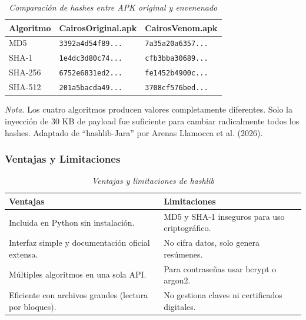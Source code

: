 \documentclass[12pt,a4paper]{article}
\begin{document}
\begin{table}[H]
\centering
\begin{threeparttable}
\caption{\textit{Comparación de hashes entre APK original y envenenado}}
\label{tab:hashes_apk}
\begin{tabular}{p{1.8cm}p{5.3cm}p{5.3cm}}
\toprule
\textbf{Algoritmo} & \textbf{CairosOriginal.apk} & \textbf{CairosVenom.apk} \\
\midrule
MD5 & \texttt{3392a4d54f89...} & \texttt{7a35a20a6357...} \\
SHA-1 & \texttt{1e4dc3d80c74...} & \texttt{cfb3bba30689...} \\
SHA-256 & \texttt{6752e6831ed2...} & \texttt{fe1452b4900c...} \\
SHA-512 & \texttt{201a5bacda49...} & \texttt{3708cf576bed...} \\
\bottomrule
\end{tabular}
\begin{tablenotes}
\item \textit{Nota.} Los cuatro algoritmos producen valores completamente diferentes. Solo la inyección de 30 KB de payload fue suficiente para cambiar radicalmente todos los hashes. Adaptado de \enquote{hashlib-Jara} por Arenas Llamocca et al. (2026).
\end{tablenotes}
\end{threeparttable}
\end{table}

\subsubsection{Ventajas y Limitaciones}

\begin{table}[H]
\centering
\begin{threeparttable}
\caption{\textit{Ventajas y limitaciones de hashlib}}
\begin{tabular}{p{6.5cm}p{6.5cm}}
\toprule
\textbf{Ventajas} & \textbf{Limitaciones} \\
\midrule
Incluida en Python sin instalación. & MD5 y SHA-1 inseguros para uso criptográfico. \\
Interfaz simple y documentación oficial extensa. & No cifra datos, solo genera resúmenes. \\
Múltiples algoritmos en una sola API. & Para contraseñas usar bcrypt o argon2. \\
Eficiente con archivos grandes (lectura por bloques). & No gestiona claves ni certificados digitales. \\
\bottomrule
\end{tabular}
\end{threeparttable}
\end{table}
\end{document}
